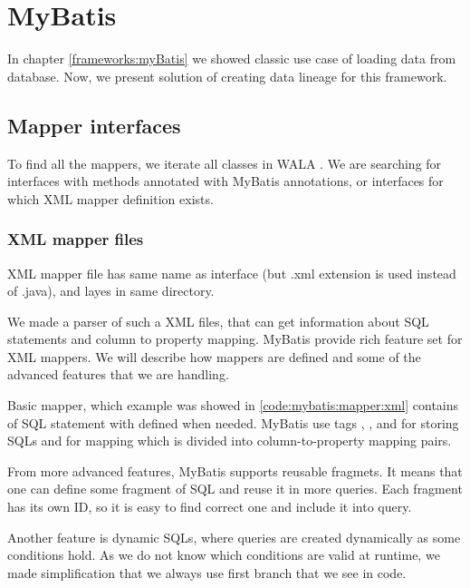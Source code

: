 


\section{MyBatis}

In chapter \ref{frameworks:myBatis} we showed classic use case of loading data from database.
Now, we present solution of creating data lineage for this framework.



\subsection{Mapper interfaces}

To find all the mappers, we iterate all classes in WALA .
We are searching for interfaces with methods annotated with MyBatis annotations,
or interfaces for which XML mapper definition exists.



\subsubsection{XML mapper files}

XML mapper file has same name as interface (but .xml extension is used instead of .java),
and layes in same directory.

We made a parser of such a XML files, that can get information about SQL statements
and column to property mapping.
MyBatis provide rich feature set for XML mappers.
We will describe how mappers are defined and some of the advanced features
that we are handling.

Basic mapper, which example was showed in \ref{code:mybatis:mapper:xml} contains of SQL statement
with defined  when needed. MyBatis use tags
, ,  and 
for storing SQLs and  for mapping which is divided into column-to-property
mapping pairs.

From more advanced features, MyBatis supports reusable fragmets. It means that
one can define some fragment of SQL and reuse it in more queries.
Each fragment has its own ID, so it is easy to find correct one and include it into query.

Another feature is dynamic SQLs, where queries are created dynamically
as some conditions hold. As we do not know which conditions are valid
at runtime, we made simplification that we always use first branch
that we see in code.



